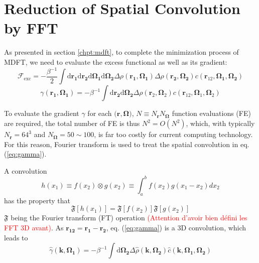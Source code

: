 
\chapter{Reduction of Spatial Convolution by FFT\label{chpt:fft-spatial}}

As presented in section \ref{chpt:mdft}, to complete the minimization
process of MDFT, we need to evaluate the excess functional as well
as its gradient:
\begin{equation}
\mathcal{F}_{\mathrm{exc}}=-\frac{\beta^{-1}}{2}\int\mathrm{d}\mathbf{r_{1}}\mathrm{d}\mathbf{r_{2}}\mathrm{d}\mathbf{\Omega_{1}}\mathrm{d}\mathbf{\Omega_{2}}\Delta\rho(\mathbf{r_{1}},\mathbf{\Omega_{1}})\Delta\rho(\mathbf{r_{2}},\mathbf{\Omega_{2}})c(\mathbf{r}_{12},\mathbf{\Omega_{1}},\mathbf{\Omega_{2}})\label{eq:fexc}
\end{equation}
\begin{equation}
\gamma(\mathbf{r_{1}},\mathbf{\Omega_{1}})=-\beta^{-1}\int\mathrm{d}\mathbf{r_{2}}\mathrm{d}\mathbf{\Omega_{2}}\Delta\rho(\mathbf{r}_{2},\mathbf{\Omega}_{2})c(\mathbf{r}_{12},\mathbf{\Omega}_{1},\mathbf{\Omega}_{2})\label{eq:gamma}
\end{equation}


To evaluate the gradient $\gamma$ for each $\mathbf{(r},\mathbf{\Omega})$,
$N\equiv N_{\mathbf{r}}N_{\mathbf{\Omega}}$ function evaluations
(FE) are required, the total number of FE is thus $N^{2}=O(N^{2})$,
which, with typically $N_{\mathbf{r}}=64^{3}$ and $N_{\mathbf{\Omega}}=50\sim100$,
is far too costly for current computing technology. For this reason,
Fourier transform is used to treat the spatial convolution in eq.
(\ref{eq:gamma}).

A convolution
\begin{equation}
h(x_{1})\equiv f(x_{2})\otimes g(x_{2})\equiv\int_{a}^{b}f(x_{2})g(x_{1}-x_{2})dx_{2}\label{eq:convolution-1}
\end{equation}
has the property that
\begin{equation}
\mathfrak{F}[h(x_{1})]=\mathfrak{F}[f(x_{2})]\mathfrak{F}[g(x_{2})]\label{eq:convolution-2}
\end{equation}
$\mathfrak{F}$ being the Fourier transform (FT) operation \textcolor{red}{(Attention
d'avoir bien défini les FFT 3D avant)}. As $\mathbf{r_{12}}=\mathbf{r_{1}}-\mathbf{r_{2}}$,
eq. (\ref{eq:gamma}) is a 3D convolution, which leads to 
\begin{equation}
\hat{\gamma}(\mathbf{k},\mathbf{\Omega_{1}})=-\beta^{-1}\int\mathrm{d}\mathbf{\Omega_{2}}\Delta\hat{\rho}(\mathbf{k},\mathbf{\Omega_{2}})\hat{c}(\mathbf{k},\mathbf{\Omega_{1}},\mathbf{\Omega_{2}})\label{eq:gamma-k}
\end{equation}


